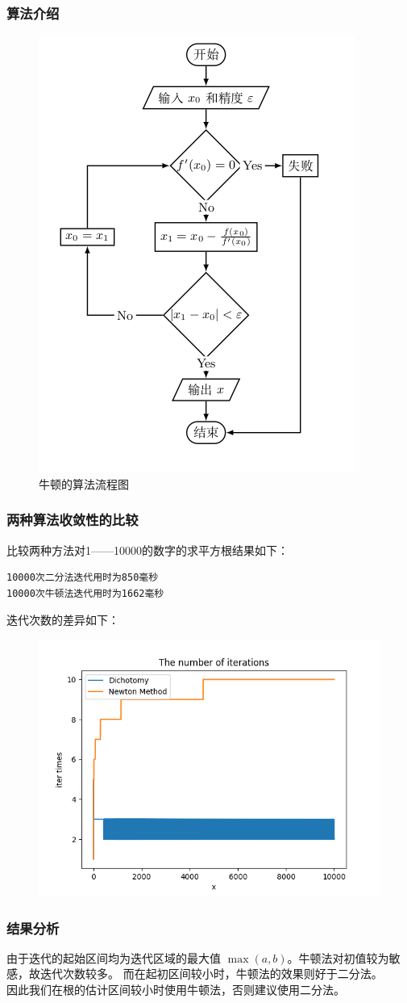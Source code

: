 \documentclass[UTF8]{ctexbeamer}
\begin{document}
    \begin{frame}
        \frametitle{算法介绍}
        \begin{figure}[H]
            \centering
            \includegraphics[scale=0.32]{Newton}
            \caption{牛顿的算法流程图}
        \end{figure}
    \end{frame}
    \begin{frame}[fragile]
        \frametitle{两种算法收敛性的比较}
        比较两种方法对1——10000的数字的求平方根结果如下：
        \begin{lstlisting}
10000次二分法迭代用时为850毫秒
10000次牛顿法迭代用时为1662毫秒
        \end{lstlisting}
        迭代次数的差异如下：
        \begin{figure}[H]
            \centering
            \includegraphics[scale=0.3]{./src/item}
        \end{figure}
    \end{frame}
    \begin{frame}
        \frametitle{结果分析}
        由于迭代的起始区间均为迭代区域的最大值 $\max(a,b)$。牛顿法对初值较为敏感，故迭代次数较多。
        而在起初区间较小时，牛顿法的效果则好于二分法。\\
        因此我们在根的估计区间较小时使用牛顿法，否则建议使用二分法。
    \end{frame}
\end{document}

